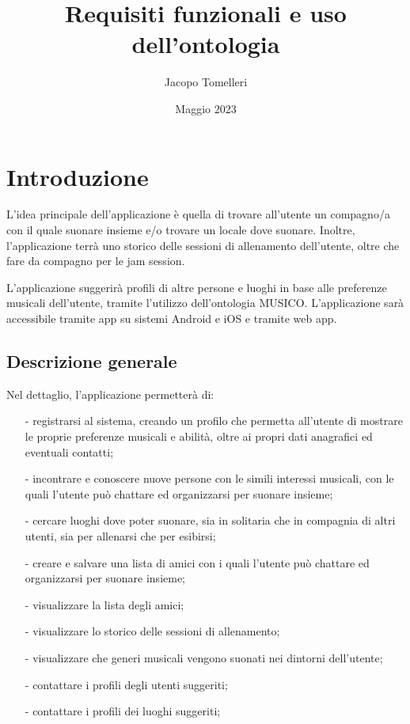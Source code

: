 \documentclass[12pt, a4paper]{article}
\title{Requisiti funzionali e uso dell'ontologia}
\date{Maggio 2023}
\author{Jacopo Tomelleri}
\begin{document}
\maketitle
\newpage
\tableofcontents
\newpage


\section{Introduzione}

L'idea principale dell'applicazione è quella di trovare all'utente un compagno/a con il quale suonare insieme e/o trovare un locale dove suonare.
Inoltre, l'applicazione terrà uno storico delle sessioni di allenamento dell'utente, oltre che fare da compagno per le jam session.

L'applicazione suggerirà profili di altre persone e luoghi in base alle preferenze musicali dell'utente, tramite l'utilizzo dell'ontologia MUSICO.
L'applicazione sarà accessibile tramite app su sistemi Android e iOS e tramite web app.

\subsection{Descrizione generale}

Nel dettaglio, l'applicazione permetterà di:
\begin{itemize}
    \item[-] registrarsi al sistema, creando un profilo che permetta all'utente di mostrare le proprie preferenze musicali e abilità, oltre ai propri dati anagrafici ed eventuali contatti;
    \item[-] incontrare e conoscere nuove persone con le simili interessi musicali, con le quali l'utente può chattare ed organizzarsi per suonare insieme;
    \item[-] cercare luoghi dove poter suonare, sia in solitaria che in compagnia di altri utenti, sia per allenarsi che per esibirsi;
    \item[-] creare e salvare una lista di amici con i quali l'utente può chattare ed organizzarsi per suonare insieme;
    \item[-] visualizzare la lista degli amici;
    \item[-] visualizzare lo storico delle sessioni di allenamento;
    \item[-] visualizzare che generi musicali vengono suonati nei dintorni dell'utente;
    \item[-] contattare i profili degli utenti suggeriti;
    \item[-] contattare i profili dei luoghi suggeriti;
\end{itemize}
\end{document}
